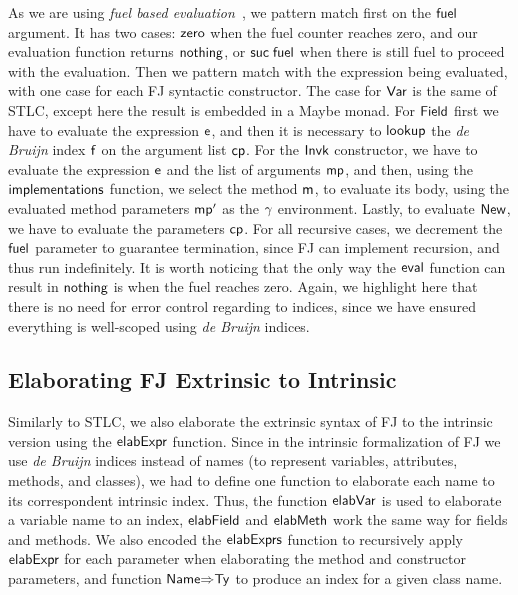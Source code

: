 \documentclass[tese,capa,english]{texufpel}
\newcommand{\D}[1]{\blue{\mathsf{#1}}}
\newcommand{\Con}[1]{\green{\mathsf{#1}}}
\newcommand{\F}[1]{\blue{\mathsf{#1}}}
\newcommand{\V}[1]{\black{\mathsf{#1}}}
\newcommand{\HC}[1]{\green{\mathsf{#1}}}
\begin{document}
As we are using \emph{fuel based evaluation}~\cite{Amin:2017:TSP:3093333.3009866,Owens:2016:FBS:3089528.3089551}, we pattern match first on the \ensuremath{\V{fuel}} argument. It has two cases: \ensuremath{\Con{zero}} when the fuel counter reaches zero, and our evaluation function returns \ensuremath{\Con{nothing}}, or \ensuremath{\Con{suc}\;\V{fuel}} when there is still fuel to proceed with the evaluation. Then we pattern match with the expression being evaluated, with one case for each FJ syntactic constructor. The case for \ensuremath{\HC{Var}} is the same of STLC, except here the result is embedded in a Maybe monad. For \ensuremath{\Con{Field}} first we have to evaluate the expression \ensuremath{\V{e}}, and then it is necessary to \ensuremath{\F{lookup}} the \emph{de Bruijn} index \ensuremath{\V{f}} on the argument list \ensuremath{\V{cp}}. For the \ensuremath{\Con{Invk}} constructor, we have to evaluate the expression \ensuremath{\V{e}} and the list of arguments \ensuremath{\V{mp}}, and then, using the \ensuremath{\D{implementations}} function, we select the method \ensuremath{\V{m}}, to evaluate its body, using the evaluated method parameters \ensuremath{\V{mp'}} as the \ensuremath{\V{\gamma}} environment. Lastly, to evaluate \ensuremath{\Con{New}}, we have to evaluate the parameters \ensuremath{\V{cp}}. For all recursive cases, we decrement the \ensuremath{\V{fuel}} parameter to guarantee termination, since FJ can implement recursion, and thus run indefinitely. It is worth noticing that the only way the \ensuremath{\F{eval}} function can result in \ensuremath{\Con{nothing}} is when the fuel reaches zero. Again, we highlight here that there is no need for error control regarding to indices, since we have ensured everything is well-scoped using \emph{de Bruijn} indices.

\subsection{Elaborating FJ Extrinsic to Intrinsic}

Similarly to STLC, we also elaborate the extrinsic syntax of FJ to the intrinsic version using the \ensuremath{\D{elabExpr}} function. Since in the intrinsic formalization of FJ we use \emph{de Bruijn} indices instead of names (to represent variables, attributes, methods, and classes), we had to define one function to elaborate each name to its correspondent intrinsic index. Thus, the function \ensuremath{\D{elabVar}} is used to elaborate a variable name to an index, \ensuremath{\D{elabField}} and \ensuremath{\D{elabMeth}} work the same way for fields and methods. We also encoded the \ensuremath{\D{elabExprs}} function to recursively apply \ensuremath{\D{elabExpr}} for each parameter when elaborating the method and constructor parameters, and function \ensuremath{\D{Name{\Rightarrow}Ty}} to produce an index for a given class name.
\end{document}
